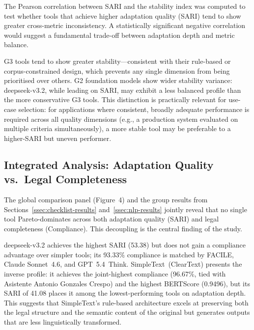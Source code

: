 \documentclass[12pt, a4paper]{article}
\begin{document}
The Pearson correlation between SARI and the stability index was computed to test whether
tools that achieve higher adaptation quality (SARI) tend to show greater cross-metric
inconsistency. A statistically significant negative correlation would suggest a
fundamental trade-off between adaptation depth and metric balance.


G3 tools tend to show greater stability---consistent with their rule-based or
corpus-constrained design, which prevents any single dimension from being prioritised
over others. G2 foundation models show wider stability variance: deepseek-v3.2, while
leading on SARI, may exhibit a less balanced profile than the more conservative G3 tools.
This distinction is practically relevant for use-case selection: for applications where
consistent, broadly adequate performance is required across all quality dimensions (e.g.,
a production system evaluated on multiple criteria simultaneously), a more stable tool may
be preferable to a higher-SARI but uneven performer.

\subsection{Integrated Analysis: Adaptation Quality vs.\ Legal Completeness}
\label{ssec:integrated}

The global comparison panel (Figure~4) and the group results from
Sections~\ref{ssec:checklist-results} and~\ref{ssec:nlp-results} jointly reveal that no
single tool Pareto-dominates across both adaptation quality (SARI) and legal completeness
(Compliance). This decoupling is the central finding of the study.

deepseek-v3.2 achieves the highest SARI (53.38) but does not gain a compliance advantage
over simpler tools; its 93.33\% compliance is matched by FACILE, Claude Sonnet~4.6, and
GPT~5.4~Think. SimpleText~(ClearText) presents the inverse profile: it achieves the
joint-highest compliance (96.67\%, tied with Asistente Antonio Gonzales Crespo) and the
highest BERTScore (0.9496), but its SARI of 41.08 places it among the lowest-performing
tools on adaptation depth. This suggests that SimpleText's rule-based architecture excels
at preserving both the legal structure and the semantic content of the original but
generates outputs that are less linguistically transformed.
\end{document}
